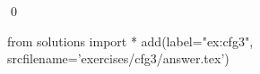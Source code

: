 
\begin{ex} 
  \label{ex:cfg3}
  
  \qed
\end{ex} 
\begin{python0}
from solutions import *
add(label="ex:cfg3",
    srcfilename='exercises/cfg3/answer.tex') 
\end{python0}
